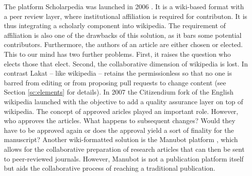\documentclass[14pt]{article}
\begin{document}
The platform Scholarpedia was launched in 2006 \cite{izhikevich_scholarpedia}. It is a wiki-based format with a peer review layer, where institutional affiliation is required for contributon. It is thus integrating a scholarly component into wikipedia. The requirement of affiliation is also one of the drawbacks of this solution, as it bars some potential contributors. Furthermore, the authors of an article are either chosen or elected. This to our mind has two further problems. First, it raises the question who elects those that elect. Second, the collaborative dimension of wikipedia is lost. In contrast Lakat -- like wikipedia -- retains the permissionless so that no one is barred from editing or from proposing pull requests to change content (see Section \ref{sc:elements} for details). In 2007 the Citizendium fork of the English wikipedia launched \cite{sanger_citizendium} with the objective to add a quality assurance layer on top of wikipedia. The concept of approved aricles played an important role. However, who approves the articles. What happens to subsequent changes? Would they have to be approved again or does the approval yield a sort of finality for the manuscript?
Another wiki-formatted solution is the Manubot platform \cite{himmelstein2019open}, which allows for the collaborative preparation of research articles that can then be sent to peer-reviewed journals. However, Manubot is not a publication platform itself but aids the collaborative process of reaching a traditional publication. 
\end{document}
